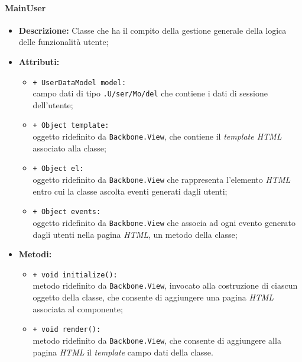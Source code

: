 \paragraph{MainUser}
\begin{flushleft}
\begin{itemize}
\item \textbf{Descrizione:} Classe che ha il compito della gestione generale della logica delle funzionalità utente;
\item \textbf{Attributi:}
\begin{sloppypar}
\begin{itemize}
\item \texttt{+ UserDataModel model:}\\ campo dati di tipo \texttt{\model{}.U\fshyp{}ser\fshyp{}Mo\fshyp{}del} che contiene i dati di sessione dell'utente;
\item \texttt{+ Object template:}\\ oggetto ridefinito da \texttt{Backbone.View}, che contiene il \textit{template HTML} associato alla classe;
\item \texttt{+ Object el:}\\ oggetto ridefinito da \texttt{Backbone.View} che rappresenta l'elemento \textit{HTML} entro cui la classe ascolta eventi generati dagli utenti;
\item \texttt{+ Object events:}\\ oggetto ridefinito da \texttt{Backbone.View} che associa ad ogni evento generato dagli utenti nella pagina \textit{HTML}, un metodo della classe;
\end{itemize}
\end{sloppypar}
\item \textbf{Metodi:}
\begin{sloppypar}
\begin{itemize}
\item \texttt{+ void initialize():}\\ metodo ridefinito da \texttt{Backbone.View}, invocato alla costruzione di ciascun oggetto della classe, che consente di aggiungere una pagina \textit{HTML} associata al componente;
\item \texttt{+ void render():}\\ metodo ridefinito da \texttt{Backbone.View}, che consente di aggiungere alla pagina \textit{HTML} il \textit{template} campo dati della classe.
\end{itemize}
\end{sloppypar}
\end{itemize}
\end{flushleft}

